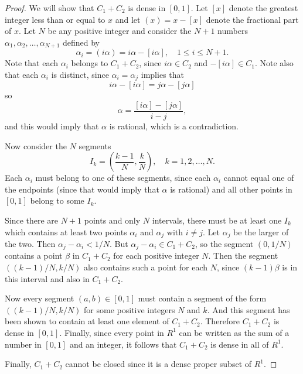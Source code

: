 \begin{enumerate}
\begin{proof}
    We will show that $C_1 + C_2$ is dense in $[0,1]$. Let $[x]$
    denote the greatest integer less than or equal to $x$ and let
    $(x) = x - [x]$ denote the fractional part of $x$. Let $N$ be any
    positive integer and consider the $N + 1$ numbers
    $\alpha_1,\alpha_2,\dots,\alpha_{N+1}$ defined by
    \begin{equation*}
      \alpha_i = (i\alpha) = i\alpha - [i\alpha],
      \quad 1\leq i\leq N+1.
    \end{equation*}
    Note that each $\alpha_i$ belongs to $C_1 + C_2$, since
    $i\alpha\in C_2$ and $-[i\alpha]\in C_1$. Note also that each
    $\alpha_i$ is distinct, since $\alpha_i = \alpha_j$ implies that
    \begin{equation*}
      i\alpha - [i\alpha] = j\alpha - [j\alpha]
    \end{equation*}
    so
    \begin{equation*}
      \alpha = \frac{[i\alpha] - [j\alpha]}{i - j},
    \end{equation*}
    and this would imply that $\alpha$ is rational, which is a
    contradiction.

    Now consider the $N$ segments
    \begin{equation*}
      I_k = \left(\frac{k-1}N, \frac{k}N\right),
      \quad k = 1, 2, \dots, N.
    \end{equation*}
    Each $\alpha_i$ must belong to one of these segments, since each
    $\alpha_i$ cannot equal one of the endpoints (since that would
    imply that $\alpha$ is rational) and all other points in $[0,1]$
    belong to some $I_k$.

    Since there are $N+1$ points and only $N$ intervals, there must be
    at least one $I_k$ which contains at least two points $\alpha_i$
    and $\alpha_j$ with $i\neq j$. Let $\alpha_j$ be the larger of the
    two. Then $\alpha_j - \alpha_i < 1/N$. But
    $\alpha_j - \alpha_i\in C_1 + C_2$, so the segment $(0, 1/N)$
    contains a point $\beta$ in $C_1 + C_2$ for each positive integer
    $N$. Then the segment $((k-1)/N, k/N)$ also contains such a point
    for each $N$, since $(k-1)\beta$ is in this interval and also in
    $C_1 + C_2$.

    Now every segment $(a,b)\in[0,1]$ must contain a segment of the
    form $((k-1)/N, k/N)$ for some positive integers $N$ and $k$. And
    this segment has been shown to contain at least one element of
    $C_1 + C_2$. Therefore $C_1 + C_2$ is dense in $[0,1]$. Finally,
    since every point in $R^1$ can be written as the sum of a number
    in $[0,1]$ and an integer, it follows that $C_1 + C_2$ is dense in
    all of $R^1$.

    Finally, $C_1 + C_2$ cannot be closed since it is a dense proper
    subset of $R^1$.
  \end{proof}
\end{enumerate}

